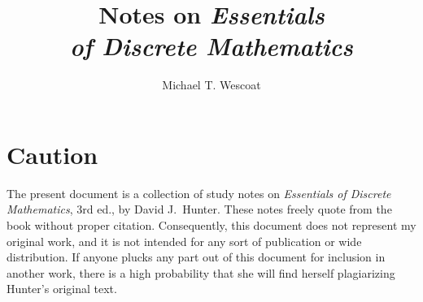 \documentclass[12pt]{book}
\begin{document}
\frontmatter

\title{Notes on \emph{Essentials\\of Discrete Mathematics}}
\author{Michael T. Wescoat}
\maketitle

\tableofcontents

\chapter*{Caution}

The present document is a collection of study notes on \emph{Essentials of Discrete Mathematics}, 3rd ed., by David J.\ Hunter.
These notes freely quote from the book without proper citation.
Consequently, this document does not represent my original work, and it is not intended for any sort of publication or wide distribution.
If anyone plucks any part out of this document for inclusion in another work, there is a high probability that she will find herself plagiarizing Hunter's original text.

\mainmatter







\end{document}
